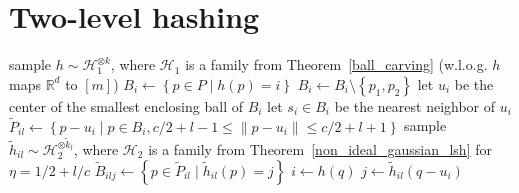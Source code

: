 \documentclass[11pt,letterpaper]{article}
\newcommand{\set}[1]{\left\{#1\right\}}
\newcommand{\Rbb}{\mathbb{R}}
\begin{document}

\section{Two-level hashing}

\begin{algorithm}
    \caption{Two-level hashing}
    \label{two_level_hashing_alg}
    \begin{algorithmic}[1]
            \State sample $h \sim \mathcal{H}_1^{\otimes k}$, where $\mathcal{H}_1$ is a family from Theorem~\ref{ball_carving} (w.l.o.g. $h$ maps $\Rbb^d$ to $[m]$)
            \State $B_i \gets \set{p \in P \mid h(p) = i}$
                    \State $B_i \gets B_i \setminus \set{p_1, p_2}$
                \EndWhile
                    \State let $u_i$ be the center of the smallest enclosing ball of $B_i$
                    \State let $s_i \in B_i$ be the nearest neighbor of $u_i$
                        \State $\widetilde{P}_{il} \gets \set{p - u_i \mid p \in B_i, c/2 + l - 1 \leq \|p - u_i\| \leq c/2 + l + 1}$
                        \State sample $\widetilde{h}_{il} \sim \mathcal{H}_2^{\otimes \widetilde{k}_l}$, where $\mathcal{H}_2$ is a family from Theorem~\ref{non_ideal_gaussian_lsh}
                        for $\eta = 1/2 + l/c$
                        \State $\widetilde{B}_{ilj} \gets \set{p \in \widetilde{P}_{il} \mid \widetilde{h}_{il}(p) = j}$
                    \EndFor
                \EndIf
            \EndFor
        \EndFunction
            \State $i \gets h(q)$
                \State\Return{$\perp$}
            \EndIf
                \State {}
            \EndIf
                    \State $j \gets \widetilde{h}_{il}(q - u_i)$
                            \State {}
                        \EndIf
                    \EndFor
                \EndIf
            \EndFor
            \State \Return{$\perp$}
        \EndFunction
    \end{algorithmic}
\end{algorithm}
\end{document}

